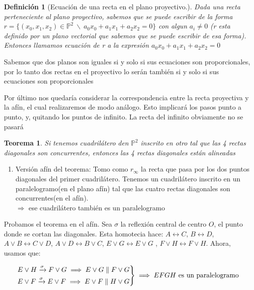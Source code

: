 \documentclass[11pt, a4paper]{article}
\makeatletter
\newif\IfInSansMode
\let\oldsf\sffamily
\renewcommand*{\sffamily}{\oldsf\mathversion{sans}\InSansModetrue}
\let\oldnorm\normalfont
\renewcommand*{\normalfont}{\oldnorm\InSansModefalse\mathversion{normal}}
\renewenvironment{proof}[1][\proofname] {\vspace{-15pt}\par\pushQED{\qed}\normalfont\topsep6\p@\@plus6\p@\relax\trivlist\item[\hskip\labelsep\it#1\@addpunct{.}]\ignorespaces}{\popQED\endtrivlist\@endpefalse}
\renewenvironment{proof}[1][\proofname] {\par\pushQED{\qed}\normalfont\topsep6\p@\@plus6\p@\relax\trivlist\item[\hskip\labelsep\itshape\sffamily#1\@addpunct{.}]\ignorespaces}{\popQED\endtrivlist\@endpefalse}
\theoremstyle{theorem-style}
\newtheorem{nth}{Teorema}[section]
\theoremstyle{definition-style}
\newtheorem{ndef}{Definición}[section]
\theoremstyle{remark-style}
\theoremstyle{example-style}
\newenvironment{nlist}
{\begin{enumerate}
    \renewcommand\labelenumi{(\emph{\roman{enumi})}}}
  {\end{enumerate}}
\newenvironment{rcases}
{\left.\begin{aligned}}
    {\end{aligned}\right\rbrace}
\makeatother
\begin{document}
\begin{ndef}[Ecuación de una recta en el plano proyectivo.]
Dada una recta perteneciente al plano proyectivo, sabemos que se puede escribir de la forma $r = \{(x_0,x_1,x_2) \in \mathbb{P}^2\ \backslash\ a_0x_0+a_1x_1+a_2x_2 = 0\}$ con algun $a_i \neq 0$ (r esta definido por un plano vectorial que sabemos que se puede escribir de esa forma). Entonces llamamos ecuación de r a la expresión $a_0x_0+a_1x_1+a_2x_2 = 0$ 
\end{ndef}
Sabemos que dos planos son iguales si y solo si sus ecuaciones son proporcionales, por lo tanto dos rectas en el proyectivo lo serán también si y solo si sus ecuaciones son proporcionales

Por  último nos quedaría considerar la correspondencia entre la recta proyectiva y la afín, el cual realizaremos de modo análogo. Esto implicará los pasos punto a punto, y, quitando los puntos de infinito. La recta del infinito obviamente no se pasará

\begin{nth}
	Si tenemos cuadrilátero den $\mathbb P ^2$ inscrito en otro tal que las 4 rectas diagonales son concurrentes, entonces las 4 rectas diagonales están alineadas
\end{nth}

\begin{proof}
	\begin{nlist}
	\item Versión afín del teorema:  Tomo como $r_\infty$ la recta que pasa por los dos puntos diagonales del primer cuadrilátero.
	Tenemos un cuadrilátero inscrito en un paralelogramo(en el plano afín) tal que las cuatro rectas diagonales son concurrentes(en el afín).\\
	$\Rightarrow$ ese cuadrilátero también es un paralelogramo
\end{nlist}

\item Probamos el teorema en el afín. Sea $\sigma$ la reflexión central de centro $O$, el punto donde se cortan las diagonales. Esta homotecia hace: $A \leftrightarrow C$, $B \leftrightarrow D$, $A\vee B \leftrightarrow C \vee D$, $A \vee D \leftrightarrow B \vee C$, $E \vee G \leftrightarrow E \vee G$ , $F \vee H \leftrightarrow F\vee H$. Ahora, usamos que:

\[
\begin{rcases}
	E\vee H \xrightarrow{\sigma} F \vee G \implies E \vee G \parallel F \vee G\\
	E\vee F \xrightarrow{\sigma} E \vee F \implies E \vee F \parallel H \vee G
\end{rcases} \implies EFGH \text{ es un paralelogramo}
\]
\end{proof}
\end{document}

